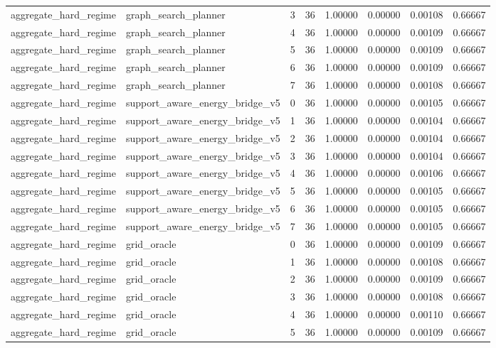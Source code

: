 \documentclass{article}
\begin{document}
\begin{table}[tbp]
{\begin{tabular}{llllllll}
aggregate\_hard\_regime & graph\_search\_planner & 3 & 36 & 1.00000 & 0.00000 & 0.00108 & 0.66667 \\
aggregate\_hard\_regime & graph\_search\_planner & 4 & 36 & 1.00000 & 0.00000 & 0.00109 & 0.66667 \\
aggregate\_hard\_regime & graph\_search\_planner & 5 & 36 & 1.00000 & 0.00000 & 0.00109 & 0.66667 \\
aggregate\_hard\_regime & graph\_search\_planner & 6 & 36 & 1.00000 & 0.00000 & 0.00109 & 0.66667 \\
aggregate\_hard\_regime & graph\_search\_planner & 7 & 36 & 1.00000 & 0.00000 & 0.00108 & 0.66667 \\
aggregate\_hard\_regime & support\_aware\_energy\_bridge\_v5 & 0 & 36 & 1.00000 & 0.00000 & 0.00105 & 0.66667 \\
aggregate\_hard\_regime & support\_aware\_energy\_bridge\_v5 & 1 & 36 & 1.00000 & 0.00000 & 0.00104 & 0.66667 \\
aggregate\_hard\_regime & support\_aware\_energy\_bridge\_v5 & 2 & 36 & 1.00000 & 0.00000 & 0.00104 & 0.66667 \\
aggregate\_hard\_regime & support\_aware\_energy\_bridge\_v5 & 3 & 36 & 1.00000 & 0.00000 & 0.00104 & 0.66667 \\
aggregate\_hard\_regime & support\_aware\_energy\_bridge\_v5 & 4 & 36 & 1.00000 & 0.00000 & 0.00106 & 0.66667 \\
aggregate\_hard\_regime & support\_aware\_energy\_bridge\_v5 & 5 & 36 & 1.00000 & 0.00000 & 0.00105 & 0.66667 \\
aggregate\_hard\_regime & support\_aware\_energy\_bridge\_v5 & 6 & 36 & 1.00000 & 0.00000 & 0.00105 & 0.66667 \\
aggregate\_hard\_regime & support\_aware\_energy\_bridge\_v5 & 7 & 36 & 1.00000 & 0.00000 & 0.00105 & 0.66667 \\
aggregate\_hard\_regime & grid\_oracle & 0 & 36 & 1.00000 & 0.00000 & 0.00109 & 0.66667 \\
aggregate\_hard\_regime & grid\_oracle & 1 & 36 & 1.00000 & 0.00000 & 0.00108 & 0.66667 \\
aggregate\_hard\_regime & grid\_oracle & 2 & 36 & 1.00000 & 0.00000 & 0.00109 & 0.66667 \\
aggregate\_hard\_regime & grid\_oracle & 3 & 36 & 1.00000 & 0.00000 & 0.00108 & 0.66667 \\
aggregate\_hard\_regime & grid\_oracle & 4 & 36 & 1.00000 & 0.00000 & 0.00110 & 0.66667 \\
aggregate\_hard\_regime & grid\_oracle & 5 & 36 & 1.00000 & 0.00000 & 0.00109 & 0.66667 \\
\bottomrule
\end{tabular}
}
\end{table}
\end{document}

